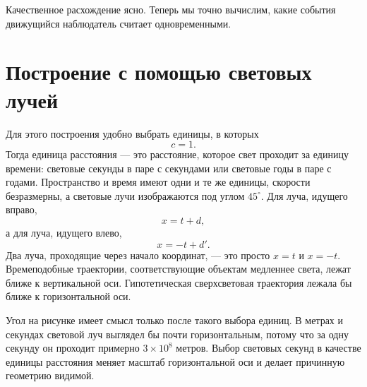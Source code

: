 \begin{classroomqa}
\end{classroomqa}

Качественное расхождение ясно. Теперь мы точно вычислим, какие события движущийся наблюдатель считает одновременными.

\section{Построение с помощью световых лучей}

Для этого построения удобно выбрать единицы, в которых
\begin{equation}
c=1.
\end{equation}
Тогда единица расстояния — это расстояние, которое свет проходит за единицу времени: световые секунды в паре с секундами или световые годы в паре с годами. Пространство и время имеют одни и те же единицы, скорости безразмерны, а световые лучи изображаются под углом \(45^\circ\). Для луча, идущего вправо,
\begin{equation}
x=t+d,
\end{equation}
а для луча, идущего влево,
\begin{equation}
x=-t+d'.
\end{equation}
Два луча, проходящие через начало координат, — это просто \(x=t\) и \(x=-t\). Времеподобные траектории, соответствующие объектам медленнее света, лежат ближе к вертикальной оси. Гипотетическая сверхсветовая траектория лежала бы ближе к горизонтальной оси.

Угол на рисунке имеет смысл только после такого выбора единиц. В метрах и секундах световой луч выглядел бы почти горизонтальным, потому что за одну секунду он проходит примерно \(3\times10^8\) метров. Выбор световых секунд в качестве единицы расстояния меняет масштаб горизонтальной оси и делает причинную геометрию видимой.

